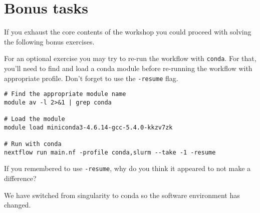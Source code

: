 %



\section{Bonus tasks}

If you exhaust the core contents of the workshop you could proceed with solving the following bonus exercises.

\begin{bonus}
For an optional exercise you may try to re-run the workflow with \texttt{conda}.
For that, you'll need to find and load a conda module before re-running the workflow with appropriate profile. Don't forget to use the \texttt{-resume} flag.
\begin{answer}
\begin{lstlisting}
# Find the appropriate module name
module av -l 2>&1 | grep conda

# Load the module
module load miniconda3-4.6.14-gcc-5.4.0-kkzv7zk

# Run with conda
nextflow run main.nf -profile conda,slurm --take -1 -resume

\end{lstlisting}
\end{answer}

If you remembered to use \texttt{-resume}, why do you think it appeared to not make a difference?

\begin{answer}
We have switched from singularity to conda so the software environment has changed.  
\end{answer}


\end{bonus}


